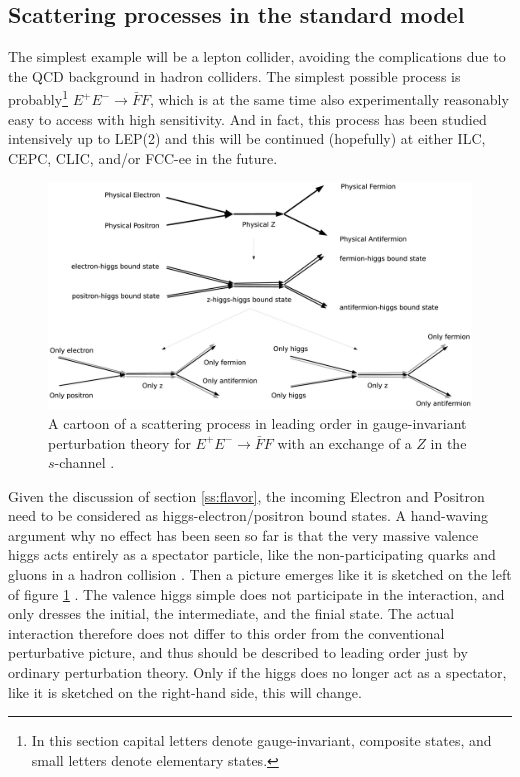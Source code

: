\documentclass[final,12pt]{article}
\newcommand*{\1}{1\!\!\!\bot}
\begin{document}
\subsection{Scattering processes in the standard model}\label{ss:gscattering}

The simplest example will be a lepton collider, avoiding the complications due to the QCD background in hadron colliders. The simplest possible process is probably\footnote{In this section capital letters denote gauge-invariant, composite states, and small letters denote elementary states.} $E^+E^-\to{\bar F}F$, which is at the same time also experimentally reasonably easy to access with high sensitivity. And in fact, this process has been studied intensively up to LEP(2) \cite{pdg} and this will be continued (hopefully) at either ILC, CEPC, CLIC, and/or FCC-ee in the future.

\begin{figure}[!htbp]
\begin{center}
\includegraphics[width=0.8\linewidth]{scattering}
\end{center}
\caption{\label{fig:scattering}A cartoon of a scattering process in leading order in gauge-invariant perturbation theory for $E^+E^-\to{\bar F}F$ with an exchange of a $Z$ in the $s$-channel \cite{Maas:2017swq}.}
\end{figure}

Given the discussion of section \ref{ss:flavor}, the incoming Electron and Positron need to be considered as higgs-electron/positron bound states. A hand-waving argument why no effect has been seen so far is that the very massive valence higgs acts entirely as a spectator particle, like the non-participating quarks and gluons in a hadron collision \cite{BeiglboCk:2006lfa}. Then a picture emerges like it is sketched on the left of  figure \ref{fig:scattering} \cite{Maas:2012tj,Egger:2017tkd}. The valence higgs simple does not participate in the interaction, and only dresses the initial, the intermediate, and the finial state. The actual interaction therefore does not differ to this order from the conventional perturbative picture, and thus should be described to leading order just by ordinary perturbation theory. Only if the higgs does no longer act as a spectator, like it is sketched on the right-hand side, this will change.
\end{document}
